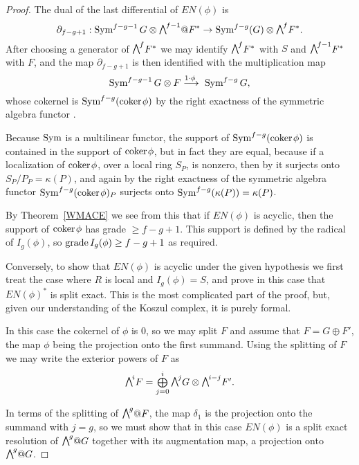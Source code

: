 \begin{proof}
The dual of the last differential of $EN(\phi)$ is
$$
\partial_{f-g+1}: \Sym^{f-g-1}G \otimes \mwedge^{f-1}@F^{*} \to
\Sym^{f-g}(G) \otimes \mwedge^{f}F^{*}.
$$
After choosing a generator of $\mwedge^{f}F^{*}$ we
may identify $\mwedge^{f}F^{*}$ with $S$ and $\mwedge^{f-1}F^{*}$ with $F$,
and the map $\partial_{f-g+1}$
is then identified with the multiplication map
$$
\Sym^{f-g-1}G \otimes F \ruto {\!1\cdot \phi} \Sym^{f-g}G
,
$$
whose cokernel is $\operatorname{Sym}^{f-g}({\rm{coker}\kern1pt} \phi)$ by the right exactness of
the symmetric algebra functor \cite[Proposition A2.2]{Eisenbud1995}. 

Because $\operatorname{Sym}$ is a multilinear functor,
the
support of $\operatorname{Sym}^{f-g}({\rm{coker}\kern1pt} \phi)$ is contained in the support
of ${\rm{coker}\kern1pt} \phi$, but in fact they are equal,
because
if a localization of
${\rm{coker}\kern1pt} \phi$, over a local ring $S_{P}$,
is nonzero, then by
it surjects onto $S_{P}/P_{P} = \kappa(P)$, and again
%
by the right exactness
of the symmetric algebra functor $\operatorname{Sym}^{f-g}({\rm{coker}\kern1pt} \phi)_{P}$ surjects
onto
$\operatorname{Sym}^{f-g}(\kappa(P)) = \kappa(P)$.

By Theorem~\ref{WMACE} we see from this that if $EN(\phi)$ is acyclic,
then the support of ${\rm{coker}\kern1pt} \phi$
has grade $\geq f-g+1$. This support is defined by the radical of
$I_{g}(\phi)$, so $\operatorname{grade} I_{g}(\phi)\geq f-g+1$ as required.

Conversely, to show that $EN(\phi)$ is acyclic under the given hypothesis
we first treat the case where $R$ is local and 
$I_{g}(\phi) = S$, and prove in this case that $EN(\phi)^{*}$ is split exact. This
is the most complicated part of the proof,
but, given our understanding of the Koszul complex, it is purely formal.

In this case the cokernel of $\phi$ is 0, so we may split $F$ and
assume that $F = G\oplus F'$, the map $\phi$ being the projection onto
the first summand. Using the splitting of $F$ we may write
the exterior powers of $F$ as  
$$
\mwedge^{i}F =\tsty\bigoplus\limits_{j=0}^{i}\mwedge^{j}G\otimes \mwedge^{i-j}F'.
$$

In terms of the splitting of $\mwedge^{g}@F$, the map $\delta_{1}$ 
is the projection onto the  summand with $j=g$, so we must show that
in this case
 $EN(\phi)$ is a split exact resolution of $\mwedge^{g}@G$ together with
 its augmentation map, a projection onto $\mwedge^{g}@G$.
 

\end{proof}
